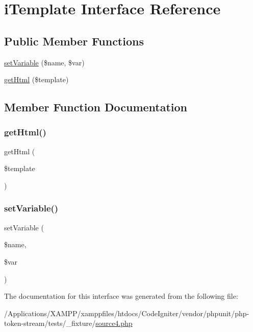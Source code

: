 \hypertarget{interfacei_template}{}\section{i\+Template Interface Reference}
\label{interfacei_template}
\subsection*{Public Member Functions}
\begin{DoxyCompactItemize}
\item 
\mbox{\hyperlink{interfacei_template_a2e22814670a5d8534537f30428a4bf87}{set\+Variable}} (\$name, \$var)
\item 
\mbox{\hyperlink{interfacei_template_ac4050b42370d3c5558297cac4dc9c89a}{get\+Html}} (\$template)
\end{DoxyCompactItemize}


\subsection{Member Function Documentation}
\mbox{\label{interfacei_template_ac4050b42370d3c5558297cac4dc9c89a}} 
\subsubsection{\texorpdfstring{get\+Html()}{getHtml()}}
{\footnotesize\ttfamily get\+Html (\begin{DoxyParamCaption}\item[{}]{\$template }\end{DoxyParamCaption})}

\mbox{\label{interfacei_template_a2e22814670a5d8534537f30428a4bf87}} 
\subsubsection{\texorpdfstring{set\+Variable()}{setVariable()}}
{\footnotesize\ttfamily set\+Variable (\begin{DoxyParamCaption}\item[{}]{\$name,  }\item[{}]{\$var }\end{DoxyParamCaption})}



The documentation for this interface was generated from the following file\+:\begin{DoxyCompactItemize}
\item 
/\+Applications/\+X\+A\+M\+P\+P/xamppfiles/htdocs/\+Code\+Igniter/vendor/phpunit/php-\/token-\/stream/tests/\+\_\+fixture/\mbox{\hyperlink{source4_8php}{source4.\+php}}\end{DoxyCompactItemize}
